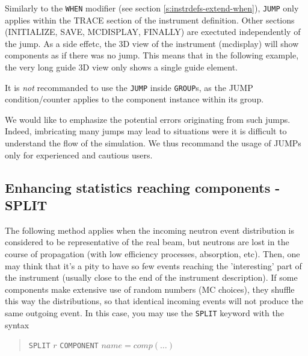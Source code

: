 Similarly to the \texttt{WHEN} modifier (see section \ref{s:instrdefs-extend-when}), \texttt{JUMP} only applies within the TRACE section of the instrument definition. Other sections (INITIALIZE, SAVE, MCDISPLAY, FINALLY) are exectuted independently of the jump. As a side effetc, the 3D view of the instrument (mcdisplay) will show components as if there was no jump. This means that in the following example, the very long guide 3D view only shows a single guide element.

It is \emph{not} recommanded to use the \verb+JUMP+ inside \verb+GROUP+s, as the JUMP condition/counter applies to the component instance within its group.

We would like to emphasize the potential errors originating from such
jumps. Indeed, imbricating many jumps may lead to situations were it
is difficult to understand the flow of the simulation. We thus recommand the usage of JUMPs only for experienced and cautious users.

\subsection{Enhancing statistics reaching components - SPLIT}
\label{s:instrdefs-extend-enhance}

The following method applies when the incoming neutron event distribution is considered to be representative of the real beam, but neutrons are lost in the course of propagation (with low efficiency processes, absorption, etc). Then, one may think that it's a pity to have so few events reaching the 'interesting' part of the instrument (usually close to the end of the instrument description).
If some components make extensive use of random numbers (MC choices), they shuffle this way the distributions, so that identical incoming events will not produce the same outgoing event. In this case, you may use the \verb+SPLIT+ keyword with the syntax

\begin{quote}
  \texttt{SPLIT} ${r}$ \texttt{COMPONENT} $\textit{name} = \textit{comp}(\ldots)$
\end{quote}

